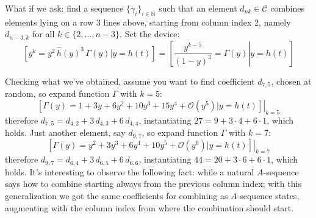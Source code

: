 What if we ask: find a sequence $\lbrace \gamma_{i} \rbrace_{i\in\mathbb{N}}$ 
such that an element $d_{nk}\in\mathcal{C}$ combines elements lying on a
row $3$ lines above, starting from column index $2$, 
namely $d_{n-3,k}$ for all $k\in\lbrace 2,\ldots,n-3\rbrace$. 
Set the device:
\begin{displaymath}
    \left[y^{k} = y^{2}\,\hat{h}(y)^3\,\Gamma(y) \big| y = h(t) \right] =
        \left.\left[\frac{y^{k-5}}{(1-y)^3} = \Gamma(y) \right| y = h(t) \right]
\end{displaymath}

Checking what we've obtained, assume you want to find coefficient $d_{7,5}$, 
chosen at random, so expand function $\Gamma$ with $k=5$:
\begin{displaymath}
    \left.\left[\Gamma(y)=1 + 3y + 6y^2 + 10y^3 + 15y^4 + \mathcal{O}(y^5) 
        \big| y = h(t) \right]\right|_{k=5}
\end{displaymath}
therefore $d_{7,5}=d_{4,2} + 3\,d_{4,3} + 6\,d_{4,4}$, 
instantiating $27 = 9 + 3\cdot4 + 6\cdot1$, which holds.
Just another element, say $d_{9,7}$, so expand function $\Gamma$ with $k=7$:
\begin{displaymath}
    \left.\left[\Gamma(y)=y^2 + 3y^3 + 6y^4 + 10y^5 +  \mathcal{O}(y^6) 
        \big| y = h(t) \right]\right|_{k=7}
\end{displaymath}
therefore $d_{9,7}=d_{6,4} + 3\,d_{6,5} + 6\,d_{6,6}$, 
instantiating $44 = 20 + 3\cdot6 + 6\cdot1$, which holds.
It's interesting to observe the following fact: while a natural $A$-sequence
says how to combine starting always from the previous column index; with
this generalization we got the same coefficients for combining as $A$-sequence
states, augmenting with the column index from where the combination should start.

